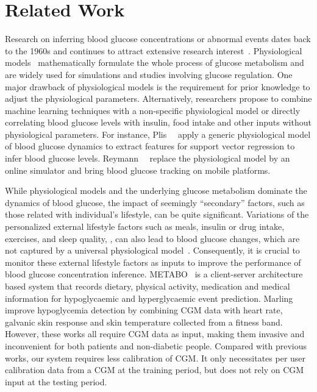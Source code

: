 \section{Related Work}
\label{sec:relwork}
Research on inferring blood glucose concentrations or abnormal events dates back to the 1960s and continues to attract extensive research interest~\cite{bib:IJNMBE16:Oviedo}.
Physiological models~\cite{bib:TBE07:Dalla, bib:PE04:Hovorka} mathematically formulate the whole process of glucose metabolism and are widely used for simulations and studies involving glucose regulation.
One major drawback of physiological models is the requirement for prior knowledge to adjust the physiological parameters.
Alternatively, researchers propose to combine machine learning techniques with a non-specific physiological model or directly correlating blood glucose levels with insulin, food intake and other inputs without physiological parameters.
For instance, Plis~\etal~\cite{bib:MAIHA14:Plis} apply a generic physiological model of blood glucose dynamics to extract features for support vector regression to infer blood glucose levels.
Reymann~\etal~\cite{bib:EMBC16:Reymann} replace the physiological model by an online simulator and bring blood glucose tracking on mobile platforms.

While physiological models and the underlying glucose metabolism dominate the dynamics of blood glucose, the impact of seemingly ``secondary'' factors, such as those related with individual's lifestyle, can be quite significant.
Variations of the personalized external lifestyle factors such as meals, insulin or drug intake, exercises, and sleep quality, \etc, can also lead to blood glucose changes, which are not captured by a universal physiological model~\cite{bib:DRCP15:Iwasaki}.
Consequently, it is crucial to monitor these external lifestyle factors as inputs to improve the performance of blood glucose concentration inference.
METABO~\cite{bib:EMBC09:Georga} is a client-server architecture based system that records dietary, physical activity, medication and medical information for hypoglycaemic and hyperglycaemic event prediction.
Marling~\etal~\cite{bib:KDHealth16:Marling} improve hypoglycemia detection by combining CGM data with heart rate, galvanic skin response and skin temperature collected from a fitness band.
However, these works all require CGM data as input, making them invasive and inconvenient for both patients and non-diabetic people.
\textcolor[rgb]{1.00,0.00,0.00}{Compared with previous works, our system requires less calibration of CGM. It only necessitates per user calibration data from a CGM at the training period, but does not rely on CGM input at the testing period.}

